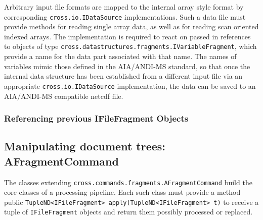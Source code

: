 \documentclass[a4paper,10pt]{article}
\begin{document}
Arbitrary input file formats are mapped to the internal array style format by
corresponding \texttt{cross.io.IDataSource} implementations. Such a data file
must provide methods for reading single array data, as well as for reading scan
oriented indexed arrays. The implementation is required to react on passed in
references to objects of type
\texttt{cross.datastructures.fragments.IVariableFragment}, which provide a name
for the data part associated with that name. The names of variables mimic those
defined in the AIA/ANDI-MS standard,
so that once the internal data structure has been established from a different
input file via an appropriate \texttt{cross.io.IDataSource} implementation, 
the data can be saved to an AIA/ANDI-MS compatible netcdf file.

\subsubsection{Referencing previous IFileFragment Objects}

\subsection{Manipulating document trees: AFragmentCommand}
The classes extending \texttt{cross.commands.fragments.AFragmentCommand}
build the core classes of a processing pipeline. Each such class must provide a method public \lstinline|TupleND<IFileFragment> apply(TupleND<IFileFragment> t)| to receive a 
tuple of \texttt{IFileFragment} objects and return them possibly processed or replaced.
\end{document}
